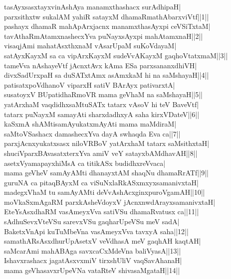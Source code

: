 \documentclass{article}
\begin{document}
tasAyxsasxtayxvinAshAya manamxthashacx surAdhipaH|\\
parxsithxtw sukalAM yahiR satayxM dhamaRmathAbarxviVtf||1||\\
pashayx dhamaR mahApArxjacnx manamxthasAyxpi ceVSiTxtaM|\\
tavAthaRmAtamxnashecxYva puNayxsAyxpi mahAtamxnaH||2||\\
visaqjAmi mahatAsxthxnaM vAsarUpaM suKoVdayaM|\\
satAyxKayxM sa ca vipArxKayxM sudeVvAKayxM gaqhoVtatxmaM||3||\\
tameVva nAshayeVtf jAcnxtAvx kAma ESa parxsananxdhiVH|\\
divxSadUrxpaH sa duSATxtAmx asAmxkaM hi na saMshayaH||4||\\
patisatxpoVdhanoV viparxH satiV BArAyx pativarxtA|\\
susatoyxV BUpatidhaRmoVR mama geVhaM na saMshayaH||5||\\
yatArxhaM vaqdidhxsaMtuSATx tatarx vAsoV hi teV BaveVtf|\\
tatarx puNayxM samayAti sharxdadhxyA saha kirxVDateV||6||\\
kaSxmA shAMtisamAyukatxmAyAti mama maMdiraM|\\
saMtoVSashacx damashecxYva dayA swhaqda Eva ca||7||\\
parxjAcnxyukatxsasx niloVRBoV yatArxhaM tatarx saMsithxtaH|\\
shuciVparxBAvasatxterxYva amiV veY satayxbAMdhavAH||8||\\
asetxVyamapayxhiMsA ca titikASx budidhxreVvaca|\\
mama geVheV samAyAMti dhanayxtAM shaqNu dhamaRrATf||9||\\
guruNA ca pitaqBAyxM ca viSuNxlaRkASxmxyxsamanivxtaH|\\
madegxVhaM tu samAyAMti deVvAshAcxginxpuroVgamAH||10||\\
moVkaSxmAgaRM parxkAsheVdoyxV jAcnxnwdArayxsamanivxtaH|\\
EteYsAsxdhaRM vasAmeyxVva satiVSu dhamaRvatusx ca||11||\\
sAdhuSevxVteVSu sarevxVSu gaqharUpeVSu meV sadA|\\
BaketxVnApi kuTuMbeVna vasAmeyxVva tavxyA saha||12||\\
samathARsAsxdhurUpAsetxV veVdhasA meV gaqhAH kaqtAH|\\
saMcarAmi mahABAga savxcaCxMdeVna baliVyasA||13||\\
Ishavxrashacx jagatAsxvxmiV tirxshUliV vaqSavAhanaH|\\
mama geVhasavxrUpeVNa vataRteV shivasaMgataH||14||\\
\end{document}
